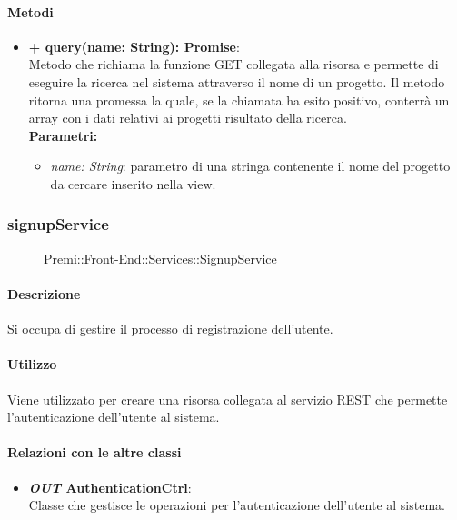 	\paragraph{Metodi}
	\begin{itemize}
		\item \textbf{+ query(name: String): Promise}:\\
		Metodo che richiama la funzione GET collegata alla risorsa e permette di eseguire la ricerca nel sistema attraverso il nome di un progetto. Il metodo ritorna una promessa la quale, se la chiamata ha esito positivo, conterrà un array con i dati relativi ai progetti risultato della ricerca.\\
		\textbf{Parametri:}\\
		\begin{itemize}
			\item \textit{name: String}: parametro di una stringa contenente il nome del progetto da cercare inserito nella view.
		\end{itemize}
	\end{itemize}
	
	
\subsubsection{signupService}
	\begin{figure}[h]
		\centering
		\caption[Premi::Front-End::Services::SignupService]{Premi::Front-End::Services::SignupService}
	\end{figure}
	
	\paragraph{Descrizione}
	Si occupa di gestire il processo di registrazione dell'utente.
	
	\paragraph{Utilizzo}
	Viene utilizzato per creare una risorsa collegata al servizio REST che permette l'autenticazione dell'utente al sistema.
	
	\paragraph{Relazioni con le altre classi}
	\begin{itemize}
		\item \textbf{\textit{OUT} AuthenticationCtrl}:\\
		Classe che gestisce le operazioni per l'autenticazione dell'utente al sistema.
	\end{itemize}
	
